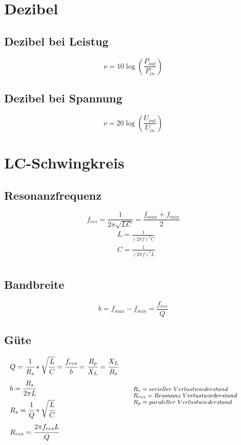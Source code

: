 \documentclass[12pt,a5paper,ngerman,titlepage]{article}
\begin{document}
\section{Dezibel}
\subsection{Dezibel bei Leistug}
$$\nu=10\log{\left(\frac{P_{out}}{P_{in}}\right)}$$
\subsection{Dezibel bei Spannung}
$$\nu=20\log{\left(\frac{U_{out}}{U_{in}}\right)}$$
\newpage
\section{LC-Schwingkreis}
\subsection{Resonanzfrequenz}
$$f_{res} = \frac{1}{2\pi \sqrt{LC}} = \frac{f_{max}+f_{min}}{2}$$
\begin{align*}
&L = \frac{1}{(2\pi f)^2C} \\[5pt]
&C = \frac{1}{(2\pi f)^2L} \\[5pt]
\end{align*}
 
\subsection{Bandbreite}
$$b = f_{max}-f_{min}= \frac{f_{res}}{Q}$$
\subsection{Güte}
\[
\begin{minipage}{.5\linewidth}
	
  $\mathrlap{Q = \cfrac{1}{R_{s}}*\sqrt{\cfrac{L}{C}} = \cfrac{f_{res}}{b}= \cfrac{R_{p}}{X_{L}} = \cfrac{X_{L}}{R_{s}}} $ \\[5pt]
  $b = \cfrac{R_{s}}{2\pi L}$\\[5pt]
  $R_{s} = \cfrac{1}{Q}*\sqrt{\cfrac{L}{C}}$\\[5pt]
  $R_{res} = \cfrac{2 \pi f_{res} L}{Q}$

\end{minipage}%
\begin{minipage}{.5\linewidth}
  \fontsize{8pt}{9pt}\selectfont
  $R_{s} = serieller \; Verlustwiederstand $ \\
  $R_{res} = Resonanz \; Verlustwiederstand $ \\
  $R_{p} = paraleller \; Verlustwiederstand $ \\


\end{minipage}
\]
\newpage
\end{document}
